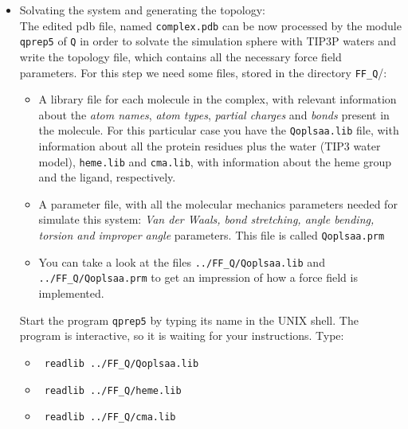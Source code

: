 \documentclass[a4paper,12pt]{article}
\newcommand{\qprep}{\texttt{qprep5}}
\newcommand{\q}{\texttt{Q}}
\begin{document}
\begin {itemize}
\begin {itemize}
\begin {itemize}
        \item ASP: 88, 173, 242
        \item GLU: 357
        \item ARG: 103, 177, 290
        \item LYS 169, 188
        \end {itemize}
    \item Note that the pdb has no hydrogens: they will be automaticaly added in the next step.
    \end {itemize}
\item Solvating the system and generating the topology:\\
The edited pdb file, named \texttt{complex.pdb} can be now
processed by the module {\qprep} of {\q} in order to solvate the
simulation sphere with TIP3P waters and write the topology file,
which contains all the necessary force field parameters. For this
step we need some files, stored in the directory
\texttt{FF{\_}Q}/:
    \begin {itemize}
    \item A library file for each molecule in the complex, with relevant information about the {\it atom names}, {\it atom types}, {\it partial charges} and {\it bonds} present in the molecule. For this particular case you have the \texttt{Qoplsaa.lib} file, with information about all the protein residues plus the water (TIP3 water model), \texttt{heme.lib} and \texttt{cma.lib}, with information about the heme group and the ligand, respectively.
    \item A parameter file, with all the  molecular mechanics parameters needed for simulate this system: {\it Van der Waals, bond stretching, angle bending, torsion and improper angle} parameters. This file is called \texttt{Qoplsaa.prm}
    \item You can take a look at the files \texttt{../FF{\_}Q/Qoplsaa.lib} and \texttt{../FF{\_}Q/Qoplsaa.prm} to get an impression of how a force field is implemented.
    \end {itemize}
Start the program {\qprep} by typing its name in the UNIX shell. The program is interactive, so it is waiting for your instructions. Type:\\
    \begin {itemize}
    \item {\texttt { readlib ../FF{\_}Q/Qoplsaa.lib}}
    \item {\texttt { readlib ../FF{\_}Q/heme.lib}}
    \item {\texttt { readlib ../FF{\_}Q/cma.lib}}

\end{itemize}
\end{itemize}
\end{document}

